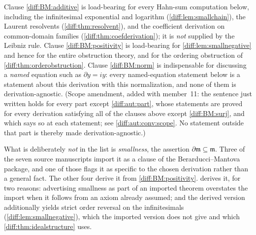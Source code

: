 \documentclass[11pt,letterpaper]{article}
\numberwithin{equation}{section}
\theoremstyle{definition}
\theoremstyle{remark}
\newcommand{\der}{\partial}
\newcommand{\mm}{\mathfrak m}
\begin{document}
\begin{warning}
\label{diff:warn:BMclauses}
Clause \ref{diff:BM:additive} is load-bearing for every Hahn-sum computation
below, including the infinitesimal exponential and logarithm
(\cref{diff:lem:smallchain}), the Laurent resolvents
(\cref{diff:thm:resolvent}), and the coefficient derivation on common-domain
families (\cref{diff:thm:coefderivation}); it is \emph{not} supplied by the
Leibniz rule. Clause \ref{diff:BM:positivity} is load-bearing for
\cref{diff:lem:smallnegative} and hence for the entire obstruction theory, and
for the ordering obstruction of \cref{diff:thm:orderobstruction}. Clause
\ref{diff:BM:norm} is indispensable for discussing a \emph{named} equation such
as $\der y=iy$: every named-equation statement below is a statement about this
derivation with this normalization, and none of them is derivation-agnostic.
(Scope amendment, added with member~11: the sentence just written holds for
every part except \cref{diff:aut:part}, whose statements are proved for every
derivation satisfying all of the clauses above except \ref{diff:BM:surj}, and
which says so at each statement; see \cref{diff:aut:conv:scope}. No statement
outside that part is thereby made derivation-agnostic.)

What is deliberately \emph{not} in the list is \emph{smallness}, the assertion
$\der\mm\subseteq\mm$. Three of the seven source manuscripts import it as a
clause of the Berarducci--Mantova package, and one of those flags it as
specific to the chosen derivation rather than a general fact. The other four
derive it from \ref{diff:BM:positivity}.  derives it,
for two reasons: advertising smallness as part of an imported theorem overstates
the import when it follows from an axiom already assumed; and the derived
version additionally yields strict order reversal on the infinitesimals
(\cref{diff:lem:smallnegative}), which the imported version does not give and
which \cref{diff:thm:idealstructure} uses.
\end{warning}
\end{document}
